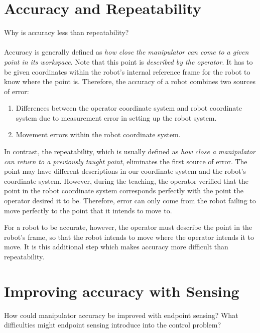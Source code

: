 \documentclass{article}
\begin{document}
\section{Accuracy and Repeatability}

Why is accuracy less than repeatability?

\paragraph{}
Accuracy is generally defined as 
	\emph{how close the manipulator can come to a given
		point in its workspace}.
Note that this point is \emph{described by the operator}.
It has to be given coordinates within the robot's internal
	reference frame for the robot to know where the point is.
Therefore, the accuracy of a robot combines two sources of error:

\begin{enumerate}
\item Differences between the operator coordinate system
	and robot coordinate system due to measurement error in 
	setting up the robot system.
\item Movement errors within the robot coordinate system.
\end{enumerate}

In contrast, the repeatability, which is usually defined as
	\emph{how close a manipulator can return to a previously
		taught point},
	eliminates the first source of error.
The point may have different descriptions in our coordinate system
	and the robot's coordinate system.
However, during the teaching, the operator verified that the point
	in the robot coordinate system corresponds perfectly with the
	point the operator desired it to be.
Therefore, error can only come from the robot failing to move perfectly
	to the point that it intends to move to.

For a robot to be accurate, however, the operator must describe
	the point in the robot's frame, so that the robot intends
	to move where the operator intends it to move.
It is this additional step which makes accuracy more difficult
	than repeatability.

\section{Improving accuracy with Sensing}

How could manipulator accuracy be improved with endpoint sensing?
What difficulties might endpoint sensing introduce into the control
	problem?
\end{document}
